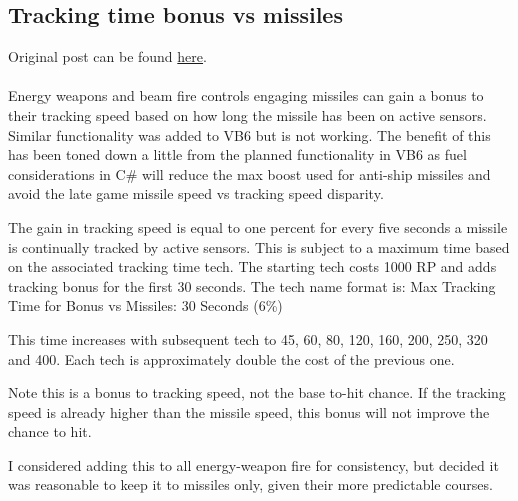 \documentclass[../../Aurora C# unofficial manual.tex]{subfiles}
\begin{document}
	\subsection{Tracking time bonus vs missiles}
	Original post can be found
	\href{http://aurora2.pentarch.org/index.php?topic=8495.msg115708#msg115708}{here}.
	\\\\
	
	Energy weapons and beam fire controls engaging missiles can gain a bonus to their tracking speed based on how long the missile has been on active sensors. Similar functionality was added to VB6 but is not working. The benefit of this has been toned down a little from the planned functionality in VB6 as fuel considerations in C\# will reduce the max boost used for anti-ship missiles and avoid the late game missile speed vs tracking speed disparity.
	
	The gain in tracking speed is equal to one percent for every five seconds a missile is continually tracked by active sensors. This is subject to a maximum time based on the associated tracking time tech. The starting tech costs 1000 RP and adds tracking bonus for the first 30 seconds. The tech name format is: Max Tracking Time for Bonus vs Missiles: 30 Seconds (6\%)
	
	This time increases with subsequent tech to 45, 60, 80, 120, 160, 200, 250, 320 and 400. Each tech is approximately double the cost of the previous one.
	
	Note this is a bonus to tracking speed, not the base to-hit chance. If the tracking speed is already higher than the missile speed, this bonus will not improve the chance to hit.
	
	I considered adding this to all energy-weapon fire for consistency, but decided it was reasonable to keep it to missiles only, given their more predictable courses.
\end{document}
